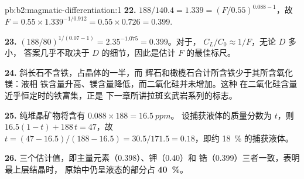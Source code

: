 \begin{solution}{pb:b2:magmatic-differentiation:1}
\textbf{22.} $188/140.4 = 1.339 = (F/0.55)^{0.088 - 1}$，故 $F = 0.55\times1.339^{-1/
0.912} = 0.55\times0.726 = 0.399$.

\textbf{23.} $(188/80)^{1/(0.07 - 1)} = 2.35^{-1.075} = 0.399$。对于，
$C_L/C_0 \approx 1/F$，无论 $D$ 多小，
答案几乎不取决于 $D$ 的细节，因此是估计 $F$ 的最佳标尺。

\textbf{24.} 斜长石不含铁，占晶体的一半，而
辉石和橄榄石合计所含铁少于其所含氧化镁：液相
铁含量升高、镁含量降低，而二氧化硅并未增加。这种
在二氧化硅含量近乎恒定时的铁富集，正是
下一章所讲拉斑玄武岩系列的标志。

\textbf{25.} 纯堆晶矿物将含有 $0.088\times188 = \qty{16.5}{ppm}$。
设捕获液体的质量分数为 $t$，则 $16.5(1 - t) + 188\,t = 47$，故 $t = (47 -
16.5)/(188 - 16.5) = 30.5/171.5 = 0.18$，即约 \qty{18}{\percent} 的捕获液体。

\textbf{26.} 三个估计值，即主量元素（0.398）、钾（0.40）和
锆（0.399）三者一致，表明最上层结晶时，
原始中仍呈液态的部分占
\textbf{\qty[text-series-to-math=true]{40}{\percent}}。
\end{solution}
